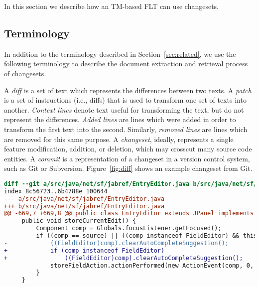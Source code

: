 
In this section we describe how an TM-based FLT can use changesets.

\subsection{Terminology}

In addition to the terminology described in Section~\ref{sec:related}, we use
the following terminology to describe the document extraction and retrieval
process of changesets.

A \textit{diff} is a set of text which represents the differences between two texts.
A \textit{patch} is a set of instructions (i.e., diffs) that is used to transform one set of texts into another.
\textit{Context lines} denote text useful for transforming the text, but do not represent the differences.
\textit{Added lines} are lines which were added in order to transform the first text into the second.
Similarly, \textit{removed lines} are lines which are removed for this same purpose.
A \textit{changeset}, ideally, represents a single feature modification,
addition, or deletion, which may crosscut many source code entities.
A \textit{commit} is a representation of a changeset in a version control system, such as Git or Subversion.
Figure~\ref{fig:diff} shows an example changeset from Git.


\begin{figure*}[t]
\centering
\footnotesize
\begin{lstlisting}[language=diff, basicstyle=\ttfamily]
diff --git a/src/java/net/sf/jabref/EntryEditor.java b/src/java/net/sf/jabref/EntryEditor.java
index 8c56723..6b4788e 100644
--- a/src/java/net/sf/jabref/EntryEditor.java
+++ b/src/java/net/sf/jabref/EntryEditor.java
@@ -669,7 +669,8 @@ public class EntryEditor extends JPanel implements VetoableChangeListener {
     public void storeCurrentEdit() {
         Component comp = Globals.focusListener.getFocused();
         if ((comp == source) || ((comp instanceof FieldEditor) && this.isAncestorOf(comp))) {
-            ((FieldEditor)comp).clearAutoCompleteSuggestion();
+            if (comp instanceof FieldEditor)
+                ((FieldEditor)comp).clearAutoCompleteSuggestion();
             storeFieldAction.actionPerformed(new ActionEvent(comp, 0, ""));
         }
     }
\end{lstlisting}
\caption{Example of a \texttt{git diff}.
This changeset addresses JabRef's Issue \#2904968.
Black or blue lines denote metadata about the change useful for patching.
In particular, black lines represent context lines (beginning with a single space).
Red lines (beginning with a single~\texttt{-}) denote line removals,
and green lines (beginning with a single~\texttt{+}) denote line additions.}
\label{fig:diff}
\vspace{-10pt}
\end{figure*}

